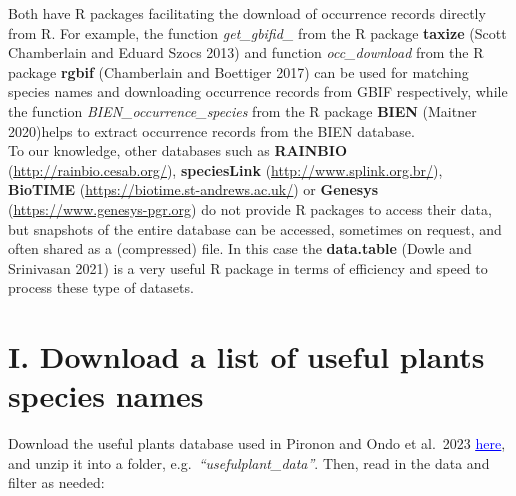 \documentclass[
]{article}
\begin{document}
Both have R packages facilitating the download of occurrence records
directly from R. For example, the function \emph{get\_gbifid\_} from the
R package \textbf{taxize} (Scott Chamberlain and Eduard Szocs 2013) and
function \emph{occ\_download} from the R package \textbf{rgbif}
(Chamberlain and Boettiger 2017) can be used for matching species names
and downloading occurrence records from GBIF respectively, while the
function \emph{BIEN\_occurrence\_species} from the R package
\textbf{BIEN} (Maitner 2020)helps to extract occurrence records from the
BIEN database.\\
To our knowledge, other databases such as \textbf{RAINBIO}
(\href{http://rainbio.cesab.org/}{\underline{http://rainbio.cesab.org/}}),
\textbf{speciesLink}
(\href{http://www.splink.org.br/}{\underline{http://www.splink.org.br/}}),
\textbf{BioTIME}
(\href{https://biotime.st-andrews.ac.uk/}{\underline{https://biotime.st-andrews.ac.uk/}})
or \textbf{Genesys}
(\href{https://www.genesys-pgr.org}{\underline{https://www.genesys-pgr.org}})
do not provide R packages to access their data, but snapshots of the
entire database can be accessed, sometimes on request, and often shared
as a (compressed) file. In this case the \textbf{data.table} (Dowle and
Srinivasan 2021) is a very useful R package in terms of efficiency and
speed to process these type of datasets.

\hypertarget{i.-download-a-list-of-useful-plants-species-names}{%
\section{I. Download a list of useful plants species
names}\label{i.-download-a-list-of-useful-plants-species-names}}

Download the useful plants database used in Pironon and Ondo et al.~2023
\href{https://www.here.com}{\textcolor{blue}{\underline{here}}}, and
unzip it into a folder, e.g.~\emph{``usefulplant\_data''}. Then, read in
the data and filter as needed:
\end{document}
